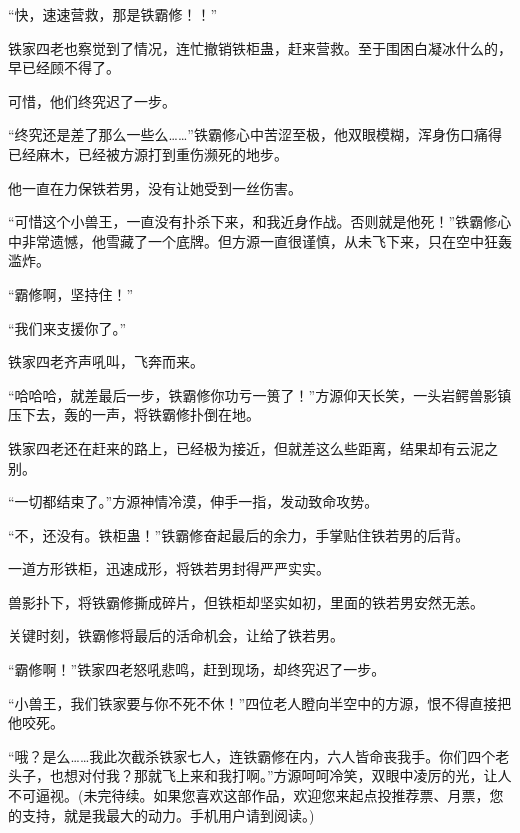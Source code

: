 \begin{this_body}
“快，速速营救，那是铁霸修！！”

铁家四老也察觉到了情况，连忙撤销铁柜蛊，赶来营救。至于围困白凝冰什么的，早已经顾不得了。

可惜，他们终究迟了一步。

“终究还是差了那么一些么……”铁霸修心中苦涩至极，他双眼模糊，浑身伤口痛得已经麻木，已经被方源打到重伤濒死的地步。

他一直在力保铁若男，没有让她受到一丝伤害。

“可惜这个小兽王，一直没有扑杀下来，和我近身作战。否则就是他死！”铁霸修心中非常遗憾，他雪藏了一个底牌。但方源一直很谨慎，从未飞下来，只在空中狂轰滥炸。

“霸修啊，坚持住！”

“我们来支援你了。”

铁家四老齐声吼叫，飞奔而来。

“哈哈哈，就差最后一步，铁霸修你功亏一篑了！”方源仰天长笑，一头岩鳄兽影镇压下去，轰的一声，将铁霸修扑倒在地。

铁家四老还在赶来的路上，已经极为接近，但就差这么些距离，结果却有云泥之别。

“一切都结束了。”方源神情冷漠，伸手一指，发动致命攻势。

“不，还没有。铁柜蛊！”铁霸修奋起最后的余力，手掌贴住铁若男的后背。

一道方形铁柜，迅速成形，将铁若男封得严严实实。

兽影扑下，将铁霸修撕成碎片，但铁柜却坚实如初，里面的铁若男安然无恙。

关键时刻，铁霸修将最后的活命机会，让给了铁若男。

“霸修啊！”铁家四老怒吼悲鸣，赶到现场，却终究迟了一步。

“小兽王，我们铁家要与你不死不休！”四位老人瞪向半空中的方源，恨不得直接把他咬死。

“哦？是么……我此次截杀铁家七人，连铁霸修在内，六人皆命丧我手。你们四个老头子，也想对付我？那就飞上来和我打啊。”方源呵呵冷笑，双眼中凌厉的光，让人不可逼视。(未完待续。如果您喜欢这部作品，欢迎您来起点投推荐票、月票，您的支持，就是我最大的动力。手机用户请到阅读。)

\end{this_body}

